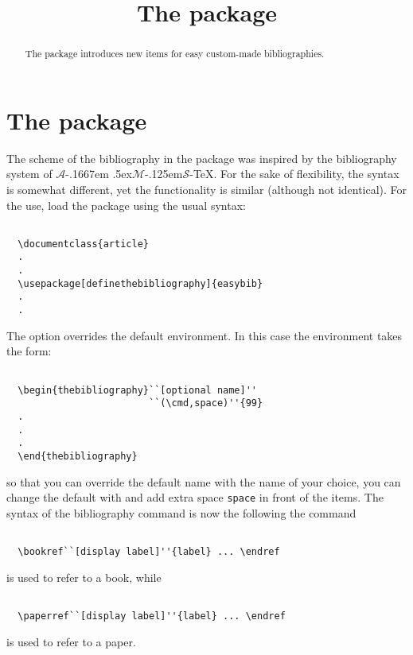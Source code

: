 \documentclass[a4paper,final,11pt]{article}
\title{The package \package{easybib}}
\newcommand{\AmSTeX}{{$\mathcal{A}$\kern-.1667em 
\lower.5ex\hbox{$\mathcal{M}$}\kern-.125em$\mathcal{S}$}-\TeX}
\begin{document}
\maketitle
\begin{abstract}
  The package 
  introduces new items for easy custom-made bibliographies.
\end{abstract}

\tableofcontents

\vfill
\clearpage

\pagestyle{fpage}
\def\sectionmark#1{\markboth{The package \package{easybib}}{The package \package{easybib}}}
\let\chaptermark\sectionmark
\let\subsectionmark\sectionmark

\section{The package }
The scheme of the bibliography in the package 
was inspired by the bibliography system of \AmSTeX{}.
For the sake of flexibility, the syntax is somewhat different,
yet the functionality is similar (although not identical).
For the use, load the package using the usual syntax:
\begin{verbatim}
  
  \documentclass{article}
  .
  .
  \usepackage[definethebibliography]{easybib}
  .
  .

\end{verbatim}
The option  overrides
the default  environment.
In this case the environment 
takes the form:
\begin{verbatim}
  
  \begin{thebibliography}``[optional name]''
                         ``(\cmd,space)''{99}
  .
  .
  .
  \end{thebibliography}

\end{verbatim}
so that you can override the default name 
with the name of your choice, you can change the default  with
 and add extra space \verb'space' in front of the items.  The
syntax of the bibliography command is now the following
the command
\begin{verbatim}

  \bookref``[display label]''{label} ... \endref

\end{verbatim}
is used to refer to a book, while 
\begin{verbatim}

  \paperref``[display label]''{label} ... \endref

\end{verbatim}
is used to refer to a paper.
\end{document}
